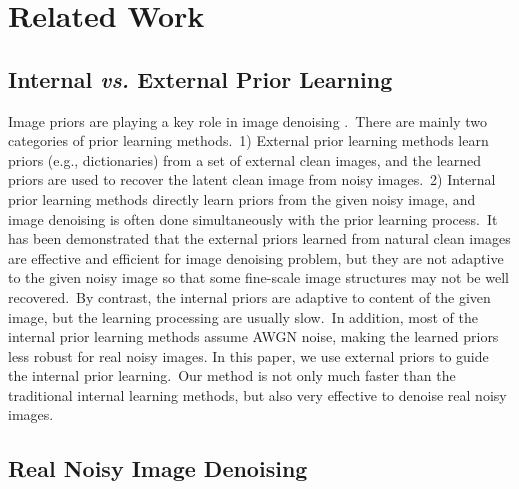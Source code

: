 \documentclass[10pt,twocolumn,letterpaper]{article}
\begin{document}
\section{Related Work}

\subsection{Internal \textbf{\emph{vs.}} External Prior Learning}

Image priors are playing a key role in image denoising \cite{ksvd,ncsr,pgpd,epll,ple,iraniinternal}.\ There are mainly two categories of prior learning methods.\ 1) External prior learning methods \cite{pgpd,foe,epll} learn priors (e.g., dictionaries) from a set of external clean images, and the learned priors are used to recover the latent clean image from noisy images.\ 2) Internal prior learning methods \cite{ksvd,ncsr,ple,iraniinternal} directly learn priors from the given noisy image, and image denoising is often done simultaneously with the prior learning process.\ It has been demonstrated \cite{pgpd,epll} that the external priors learned from natural clean images are effective and efficient for image denoising problem, but they are not adaptive to the given noisy image so that some fine-scale image structures may not be well recovered.\ By contrast, the internal priors are adaptive to content of the given image, but the learning processing are usually slow.\ In addition, most of the internal prior learning methods \cite{ksvd,ncsr,ple,iraniinternal} assume AWGN noise, making the learned priors less robust for real noisy images. In this paper, we use external priors to guide the internal prior learning.\ Our method is not only much faster than the traditional internal learning methods, but also very effective to denoise real noisy images.

\subsection{Real Noisy Image Denoising}
\end{document}
